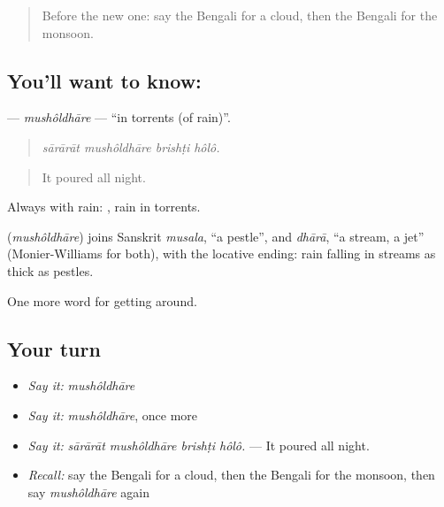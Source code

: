 \label{lesson:BN-C425-musholdhare}



\begin{quote}
Before the new one: say the Bengali for a cloud, then the Bengali for the monsoon.
\end{quote}

\subsection*{You'll want to know: }
\textbf{} — \emph{mushôldhāre} — \textquotedblleft{}in torrents (of rain)\textquotedblright{}.

\begin{quote}
   
\end{quote}

\begin{quote}
\emph{sārārāt mushôldhāre brishṭi hôlô.}
\end{quote}

\begin{quote}
It poured all night.
\end{quote}

Always with rain:  , rain in torrents.

\begin{cousinweb}
\textbf{} (\emph{mushôldhāre}) joins Sanskrit \emph{musala}, \textquotedblleft{}a pestle\textquotedblright{}, and \emph{dhārā}, \textquotedblleft{}a stream, a jet\textquotedblright{} (Monier-Williams for both), with the locative ending: rain falling in streams as thick as pestles.
\end{cousinweb}

\begin{grammarlens}[title={What you've built}]
One more word for getting around.
\end{grammarlens}

\subsection*{Your turn}
\begin{itemize}
\raggedright
  \item \emph{Say it:} \emph{mushôldhāre}
  \item \emph{Say it:} \emph{mushôldhāre}, once more
  \item \emph{Say it:} \emph{sārārāt mushôldhāre brishṭi hôlô.} — It poured all night.
  \item \emph{Recall:} say the Bengali for a cloud, then the Bengali for the monsoon, then say \emph{mushôldhāre} again
\end{itemize}

